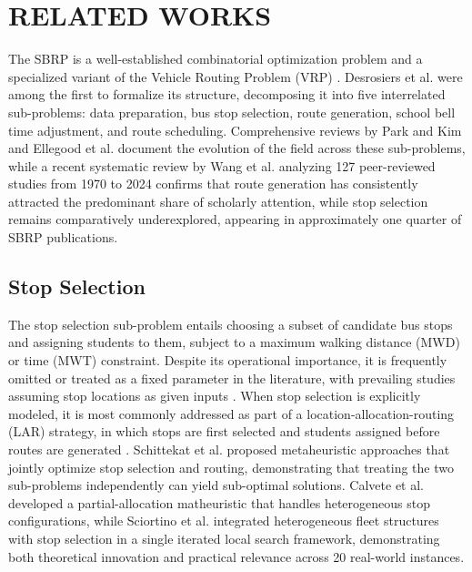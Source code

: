 \documentclass[journal]{IEEEtran}
\begin{document}
\section{RELATED WORKS}

The SBRP is a well-established combinatorial optimization problem and 
a specialized variant of the Vehicle Routing Problem (VRP) \cite{c10}. 
Desrosiers et al. \cite{c5} were among the first to formalize its 
structure, decomposing it into five interrelated sub-problems: data 
preparation, bus stop selection, route generation, school bell time 
adjustment, and route scheduling. Comprehensive reviews by Park and 
Kim \cite{c3} and Ellegood et al. \cite{c1} document the evolution of 
the field across these sub-problems, while a recent systematic review 
by Wang et al. \cite{c4} analyzing 127 peer-reviewed studies from 
1970 to 2024 confirms that route generation has consistently attracted 
the predominant share of scholarly attention, while stop selection 
remains comparatively underexplored, appearing in approximately one 
quarter of SBRP publications.

\subsection{Stop Selection}

The stop selection sub-problem entails choosing a subset of candidate 
bus stops and assigning students to them, subject to a maximum walking 
distance (MWD) or time (MWT) constraint. Despite its operational 
importance, it is frequently omitted or treated as a fixed parameter 
in the literature, with prevailing studies assuming stop locations as 
given inputs \cite{c4}. When stop selection is explicitly modeled, it 
is most commonly addressed as part of a location-allocation-routing 
(LAR) strategy, in which stops are first selected and students 
assigned before routes are generated \cite{c11}. Schittekat et al. 
\cite{c6} proposed metaheuristic approaches that jointly optimize 
stop selection and routing, demonstrating that treating the two 
sub-problems independently can yield sub-optimal solutions. Calvete 
et al. \cite{c12} developed a partial-allocation matheuristic that 
handles heterogeneous stop configurations, while Sciortino et al. 
\cite{c15} integrated heterogeneous fleet structures with stop 
selection in a single iterated local search framework, demonstrating 
both theoretical innovation and practical relevance across 20 
real-world instances.
\end{document}
